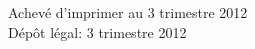 \cleardoublepage
\mbox{}
\vfill

{\scriptsize
\begin{center}
Achevé d'imprimer au 3 trimestre 2012 \\
Dépôt légal: 3 trimestre 2012
\end{center}
}
\enlargethispage{\footskip}


